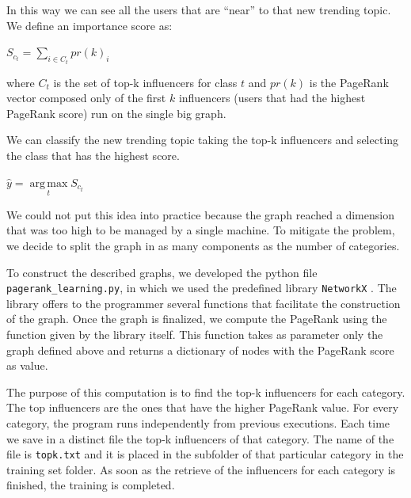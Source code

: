 \documentclass[journal,11pt]{vgtc}
\DeclareMathOperator*{\argmax}{arg\,max}
\begin{document}
\bigskip

In this way we can see all the users that are ``near'' to that new trending topic.
We define an importance score as:

\medskip

\begin{center}
$
S_{c_t}=\sum\limits_{i \in C_t} pr(k)_i
$
\end{center}

\medskip

where $C_t$ is the set of top-k influencers for class $t$ and $pr(k)$ is the PageRank vector composed
only of the first $k$ influencers (users that had the highest PageRank score) run on the single big graph.

We can classify the new trending topic taking the top-k influencers and selecting the class that has the highest score.

\medskip

\begin{center}
$
\hat{y}=\argmax\limits_{t} S_{c_t}
$
\end{center}

\medskip

We could not put this idea into practice because the graph reached a dimension that was too high
to be managed by a single machine.
To mitigate the problem, we decide to split the graph in as many components as the number of categories.

To construct the described graphs, we developed the python file \texttt{pagerank\_learning.py},
in which we used the predefined library \texttt{NetworkX} \cite{networkx}.
The library offers to the programmer several functions that facilitate the construction of the graph.
Once the graph is finalized, we compute the PageRank using the function given by the library itself.
This function takes as parameter only the graph defined above and returns a dictionary of nodes
with the PageRank score as value.

The purpose of this computation is to find the top-k influencers for each category. The top influencers
are the ones that have the higher PageRank value.
For every category, the program runs independently from previous executions. Each time we save in a
distinct file the top-k influencers of that category. The name of the file is
\texttt{topk.txt} and it is placed in the subfolder of that particular category in the training set folder.
As soon as the retrieve of the influencers for each category is finished, the training is completed.
\end{document}
